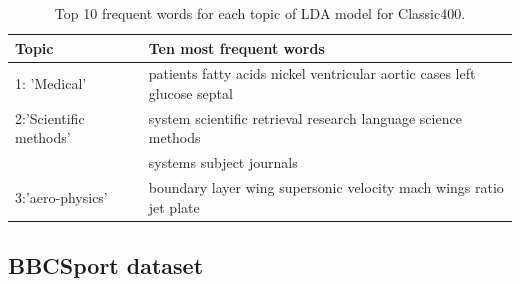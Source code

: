 \documentclass{article} %
\begin{document}
\begin{table}
\centering
    \begin{tabular}{|l|l|}
    \hline
    Topic                      & Ten most frequent words                                                            \\ \hline
    1: 'Medical'           & patients  fatty  acids  nickel  ventricular  aortic  cases  left  glucose  septal   \\ \hline
    2:'Scientific methods' & system  scientific  retrieval  research  language  science  methods                 \\
    ~                          &  systems  subject  journals                                                         \\ \hline
    3:'aero-physics'       & boundary  layer  wing  supersonic  velocity  mach  wings  ratio  jet  plate         \\ \hline
    \end{tabular}
    \caption{Top 10 frequent words for each topic of LDA model for Classic400.}
    \label{table3}
    \end{table}
\subsection{BBCSport dataset}
\end{document}
